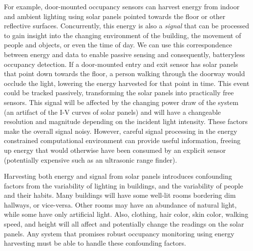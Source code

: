 For example, door-mounted occupancy sensors can harvest energy from indoor and ambient lighting using solar panels pointed towards the floor or other reflective surfaces.
Concurrently, this energy is also a \textit{signal} that can be processed to gain insight into the changing environment of the building, the movement of people and objects, or even the time of day.
We can use this correspondence between energy and data to enable passive sensing and consequently, batteryless occupancy detection.
If a door-mounted entry and exit sensor has solar panels that point down towards the floor, a person walking through the doorway would occlude the light, lowering the energy harvested for that point in time.
This event could be tracked passively, transforming the solar panels into practically free sensors.
This signal will be affected by the changing power draw of the system (an artifact of the I-V curves of solar panels) and will have a changeable resolution and magnitude depending on the incident light intensity.
These factors make the overall signal noisy.
However, careful signal processing in the energy constrained computational environment can provide useful information, freeing up energy that would otherwise have been consumed by an explicit sensor (potentially expensive such as an ultrasonic range finder).

Harvesting both energy and signal from solar panels introduces confounding factors from the variability of lighting in buildings, and the variability of people and their habits.
Many buildings will have some well-lit rooms bordering dim hallways, or vice-versa.
Other rooms may have an abundance of natural light, while some have only artificial light.
Also, clothing, hair color, skin color, walking speed, and height will all affect and potentially change the readings on the solar panels.
Any system that promises robust occupancy monitoring using energy harvesting must be able to handle these  confounding factors.








